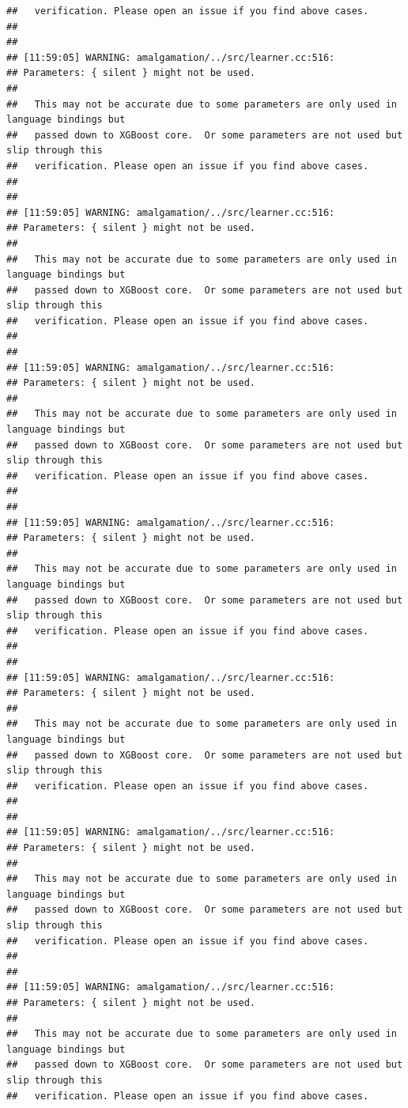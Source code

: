 \documentclass[AMS,STIX2COL]{WileyNJD-v2}\usepackage[]{graphicx}\usepackage[]{color}
\makeatletter
\newenvironment{kframe}{%
 \def\at@end@of@kframe{}%
 \ifinner\ifhmode%
  \def\at@end@of@kframe{\end{minipage}}%
  \begin{minipage}{\columnwidth}%
 \fi\fi%
 \def\FrameCommand##1{\hskip\@totalleftmargin \hskip-\fboxsep
 \colorbox{shadecolor}{##1}\hskip-\fboxsep
     \hskip-\linewidth \hskip-\@totalleftmargin \hskip\columnwidth}%
 \MakeFramed {\advance\hsize-\width
   \@totalleftmargin\z@ \linewidth\hsize
   \@setminipage}}%
 {\par\unskip\endMakeFramed%
 \at@end@of@kframe}
\newenvironment{knitrout}{}{} %
\makeatother
\begin{document}
\begin{knitrout}
\begin{kframe}
\begin{verbatim}
##   verification. Please open an issue if you find above cases.
## 
## 
## [11:59:05] WARNING: amalgamation/../src/learner.cc:516: 
## Parameters: { silent } might not be used.
## 
##   This may not be accurate due to some parameters are only used in language bindings but
##   passed down to XGBoost core.  Or some parameters are not used but slip through this
##   verification. Please open an issue if you find above cases.
## 
## 
## [11:59:05] WARNING: amalgamation/../src/learner.cc:516: 
## Parameters: { silent } might not be used.
## 
##   This may not be accurate due to some parameters are only used in language bindings but
##   passed down to XGBoost core.  Or some parameters are not used but slip through this
##   verification. Please open an issue if you find above cases.
## 
## 
## [11:59:05] WARNING: amalgamation/../src/learner.cc:516: 
## Parameters: { silent } might not be used.
## 
##   This may not be accurate due to some parameters are only used in language bindings but
##   passed down to XGBoost core.  Or some parameters are not used but slip through this
##   verification. Please open an issue if you find above cases.
## 
## 
## [11:59:05] WARNING: amalgamation/../src/learner.cc:516: 
## Parameters: { silent } might not be used.
## 
##   This may not be accurate due to some parameters are only used in language bindings but
##   passed down to XGBoost core.  Or some parameters are not used but slip through this
##   verification. Please open an issue if you find above cases.
## 
## 
## [11:59:05] WARNING: amalgamation/../src/learner.cc:516: 
## Parameters: { silent } might not be used.
## 
##   This may not be accurate due to some parameters are only used in language bindings but
##   passed down to XGBoost core.  Or some parameters are not used but slip through this
##   verification. Please open an issue if you find above cases.
## 
## 
## [11:59:05] WARNING: amalgamation/../src/learner.cc:516: 
## Parameters: { silent } might not be used.
## 
##   This may not be accurate due to some parameters are only used in language bindings but
##   passed down to XGBoost core.  Or some parameters are not used but slip through this
##   verification. Please open an issue if you find above cases.
## 
## 
## [11:59:05] WARNING: amalgamation/../src/learner.cc:516: 
## Parameters: { silent } might not be used.
## 
##   This may not be accurate due to some parameters are only used in language bindings but
##   passed down to XGBoost core.  Or some parameters are not used but slip through this
##   verification. Please open an issue if you find above cases.

\end{verbatim}
\end{kframe}
\end{knitrout}
\end{document}
